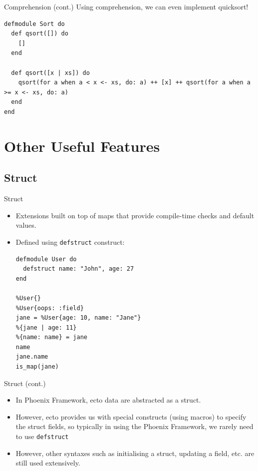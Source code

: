 \documentclass[12pt]{beamer}
\begin{document}
\begin{frame}[fragile]{Comprehension (cont.)}
  Using comprehension, we can even implement quicksort!
  \begin{verbatim}
defmodule Sort do
  def qsort([]) do
    []
  end

  def qsort([x | xs]) do
    qsort(for a when a < x <- xs, do: a) ++ [x] ++ qsort(for a when a >= x <- xs, do: a)
  end
end
  \end{verbatim}
\end{frame}

\section{Other Useful Features}
\subsection{Struct}
\begin{frame}[fragile]{Struct}
  \begin{itemize}
    \item Extensions built on top of maps that provide compile-time checks and default values.
    \item Defined using \texttt{defstruct} construct:
          \begin{verbatim}
defmodule User do
  defstruct name: "John", age: 27
end

%User{}
%User{oops: :field}
jane = %User{age: 10, name: "Jane"}
%{jane | age: 11}
%{name: name} = jane
name
jane.name
is_map(jane)
  \end{verbatim}
  \end{itemize}
\end{frame}

\begin{frame}{Struct (cont.)}
  \begin{itemize}
    \item In Phoenix Framework, ecto data are abstracted as a struct.
    \item However, ecto provides us with special constructs (using macros) to specify the struct fields, so typically in using the Phoenix Framework, we rarely need to use \texttt{defstruct}
    \item However, other syntaxes such as initialising a struct, updating a field, etc. are still used extensively.
  \end{itemize}
\end{frame}
\end{document}
